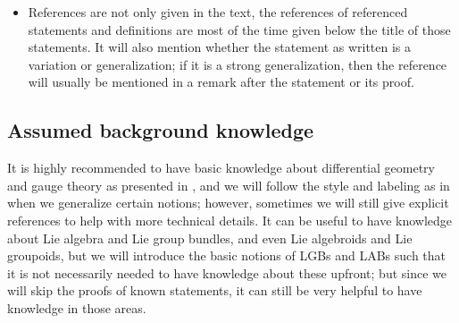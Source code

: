 \documentclass[reqno,a4paper,oneside]{amsart}
\theoremstyle{plain}
\theoremstyle{remark}
\newtheorem{remark}[theorem]{Remarks}
\theoremstyle{definition}
\begin{document}
\begin{itemize}
In case of antisymmetric tensors we get of course:

\begin{propositions}{Graded extensions of antisymmetric tensors}{GradedExtensionPlusAntiSymm}
Let $E_1, E_2 \to N$ be real vector bundles of finite rank over a smooth manifold $N$, $F \in \Omega^2(E_1; E_2)$. Then
\begin{equation*}
F \mleft( A \stackrel{\wedge}{,} B \mright)
=
-\mleft( -1 \mright)^{km}
F \mleft( B \stackrel{\wedge}{,} A \mright)
\end{equation*}
for all $A \in \Omega^k(N; E_1)$ and $B \in \Omega^m(N; E_1)$ ($k,m \in \mathbb{N}_0$). Similarly extended to all $F \in \Omega^l(E_1; E_2)$.
\end{propositions}


\begin{proof}
\leavevmode\newline
Trivial, for example by using local coordinates.
\end{proof}

\item References are not only given in the text, the references of referenced statements and definitions are most of the time given below the title of those statements. It will also mention whether the statement as written is a variation or generalization; if it is a strong generalization, then the reference will usually be mentioned in a remark after the statement or its proof.

\end{itemize}

\subsection{Assumed background knowledge}
It is highly recommended to have basic knowledge about differential geometry and gauge theory as presented in \cite[especially Chapter 1 to 5]{Hamilton}, and we will follow the style and labeling as in \cite{Hamilton} when we generalize certain notions; however, sometimes we will still give explicit references to help with more technical details. It can be useful to have knowledge about Lie algebra and Lie group bundles, and even Lie algebroids and Lie groupoids, but we will introduce the basic notions of LGBs and LABs such that it is not necessarily needed to have knowledge about these upfront; but since we will skip the proofs of known statements, it can still be very helpful to have knowledge in those areas.
\end{document}
